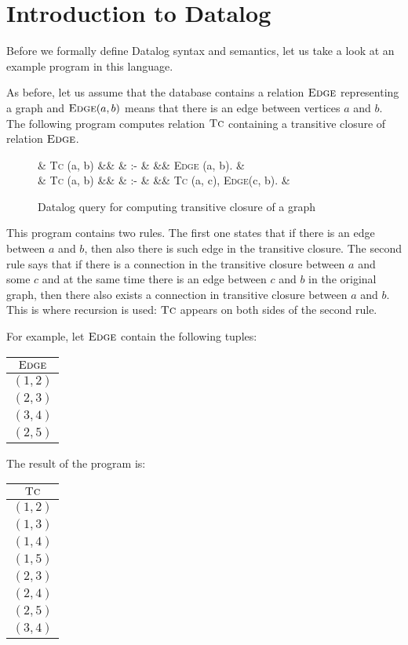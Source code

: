 \documentclass{pracamgr}
\theoremstyle{plain}
\theoremstyle{definition}
\theoremstyle{remark}
\newenvironment{centab}[1]{\begin{center}\begin{tabular}{#1}}{\end{tabular}\end{center}}
\newcommand{\narrow}[1]{\begin{changemargin}{2cm}{2cm} #1 \end{changemargin}}
\newcommand{\dprog}[4]{
  \begin{figure}[h!]
    \narrow{
      #1
      \begin{flalign*}
      #2
      \end{flalign*}
      \caption{#3}
      \label{#4}
    }
\end{figure}

}
\begin{document}
\section{Introduction to Datalog}

Before we formally define Datalog syntax and semantics, let us take a look at an example program in this language.

As before, let us assume that the database contains a relation $\textsc{Edge}$ representing a graph and $\textsc{Edge}(a, b)$ means that there is an edge between vertices $a$ and $b$. The following program computes relation $\textsc{Tc}$ containing a transitive closure of relation $\textsc{Edge}$.

\dprog{}{
  & \textsc{Tc} (a, b) &&  & :- & && \textsc{Edge} (a, b). & \\
  & \textsc{Tc} (a, b) &&  & :- & && \textsc{Tc} (a, c), \textsc{Edge}(c, b). &\\
}{Datalog query for computing transitive closure of a graph}{ex:tcdatalog}

This program contains two rules. The first one states that if there is an edge between $a$ and $b$, then also there is such edge in the transitive closure. The second rule says that if there is a connection in the transitive closure between $a$ and some $c$ and at the same time there is an edge between $c$ and $b$ in the original graph, then there also exists a connection in transitive closure between $a$ and $b$. This is where recursion is used: $\textsc{Tc}$ appears on both sides of the second rule.

For example, let $\textsc{Edge}$ contain the following tuples:

\begin{centab}{ | c | }
  \hline
  $\textsc{Edge}$ \\
  \hline
  $(1, 2)$ \\
  $(2, 3)$ \\
  $(3, 4)$ \\
  $(2, 5)$ \\
  \hline
\end{centab}

The result of the program is:

\begin{centab}{ | c | }
  \hline
  $\textsc{Tc}$ \\
  \hline
  $(1, 2)$ \\
  $(1, 3)$ \\
  $(1, 4)$ \\
  $(1, 5)$ \\
  $(2, 3)$ \\
  $(2, 4)$ \\
  $(2, 5)$ \\
  $(3, 4)$ \\
  \hline
\end{centab}
\end{document}
